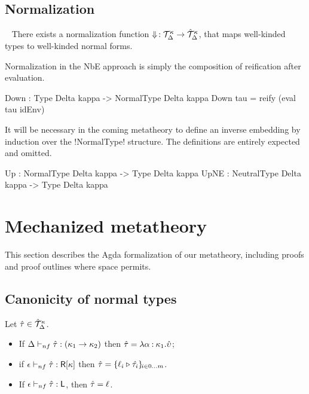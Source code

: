 \documentclass[sigplan,10pt,anonymous,review]{acmart}\settopmatter{printfolios=true,printccs=false,printacmref=false}
\begin{document}
\subsection{Normalization}

\ifthms
\begin{theorem}[Normalization] ~
  There exists a normalization function $\Norm\, : \TJudges{\Delta}{\kappa} \to \TJudgesNF{\Delta}{\kappa}$, that maps well-kinded types to well-kinded normal forms.
\end{theorem}\fi

Normalization in the NbE approach is simply the composition of reification after evaluation. 

\begin{agda} 
Down : Type Delta kappa -> NormalType Delta kappa
Down tau = reify (eval tau idEnv)
\end{agda}

It will be necessary in the coming metatheory to define an inverse embedding by induction over the !NormalType! structure. The definitions are entirely expected and omitted. 

\begin{agda}
Up : NormalType Delta kappa -> Type Delta kappa
UpNE : NeutralType Delta kappa -> Type Delta kappa
\end{agda}

\section{Mechanized metatheory}

This section describes the Agda formalization of our metatheory, including proofs and proof outlines where space permits.

\subsection{Canonicity of normal types}
\ifthms
\begin{theorem}[Canonicity]
  Let $\Normal\tau \in \TJudgesNF{\Delta}{\kappa}$.
  \begin{itemize}
    \item If $\KindJNF \Delta {\Normal\tau} {(\kappa_{1} \to \kappa_{2})}$ then $\Normal\tau = {\lambda \alpha \co \kappa_{1}. \Normal\upsilon}$;
    \item if $\KindJNF \epsilon {\Normal\tau} {\RowK \kappa}$ then $\Normal\tau =  \RowIx i 0 m {\LabTy {\ell_i} {\Normal{\tau_i}}}$.
    \item If $\KindJNF \epsilon {\Normal\tau} \LabK$, then $\Normal\tau = \ell$.
  \end{itemize}
\end{theorem}
\fi
\end{document}
